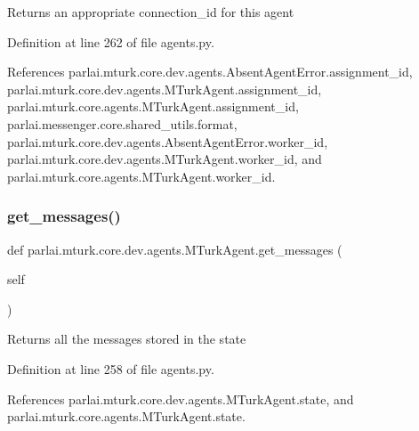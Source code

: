 \begin{DoxyVerb}Returns an appropriate connection_id for this agent\end{DoxyVerb}
 

Definition at line 262 of file agents.\+py.



References parlai.\+mturk.\+core.\+dev.\+agents.\+Absent\+Agent\+Error.\+assignment\+\_\+id, parlai.\+mturk.\+core.\+dev.\+agents.\+M\+Turk\+Agent.\+assignment\+\_\+id, parlai.\+mturk.\+core.\+agents.\+M\+Turk\+Agent.\+assignment\+\_\+id, parlai.\+messenger.\+core.\+shared\+\_\+utils.\+format, parlai.\+mturk.\+core.\+dev.\+agents.\+Absent\+Agent\+Error.\+worker\+\_\+id, parlai.\+mturk.\+core.\+dev.\+agents.\+M\+Turk\+Agent.\+worker\+\_\+id, and parlai.\+mturk.\+core.\+agents.\+M\+Turk\+Agent.\+worker\+\_\+id.

\mbox{\label{classparlai_1_1mturk_1_1core_1_1dev_1_1agents_1_1MTurkAgent_a51dcf248b6b614e391f83ff6a195787c}} 
\subsubsection{\texorpdfstring{get\+\_\+messages()}{get\_messages()}}
{\footnotesize\ttfamily def parlai.\+mturk.\+core.\+dev.\+agents.\+M\+Turk\+Agent.\+get\+\_\+messages (\begin{DoxyParamCaption}\item[{}]{self }\end{DoxyParamCaption})}

\begin{DoxyVerb}Returns all the messages stored in the state\end{DoxyVerb}
 

Definition at line 258 of file agents.\+py.



References parlai.\+mturk.\+core.\+dev.\+agents.\+M\+Turk\+Agent.\+state, and parlai.\+mturk.\+core.\+agents.\+M\+Turk\+Agent.\+state.

\mbox{\label{classparlai_1_1mturk_1_1core_1_1dev_1_1agents_1_1MTurkAgent_aab8cc8a2bb337300bd39709702e68cff}} 
